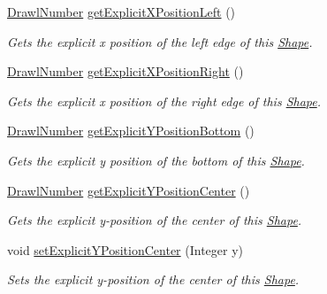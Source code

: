 \begin{DoxyCompactItemize}
\hyperlink{classcom_1_1aarrelaakso_1_1drawl_1_1_drawl_number}{Drawl\+Number} \hyperlink{classcom_1_1aarrelaakso_1_1drawl_1_1_shape_a339cf8811f57b7cb5251109b04be953c}{get\+Explicit\+X\+Position\+Left} ()
\begin{DoxyCompactList}\small\item\em Gets the explicit x position of the left edge of this \hyperlink{classcom_1_1aarrelaakso_1_1drawl_1_1_shape}{Shape}. \end{DoxyCompactList}\item 
\hyperlink{classcom_1_1aarrelaakso_1_1drawl_1_1_drawl_number}{Drawl\+Number} \hyperlink{classcom_1_1aarrelaakso_1_1drawl_1_1_shape_a19970b658b55e4e61de31aaaef8cf7fe}{get\+Explicit\+X\+Position\+Right} ()
\begin{DoxyCompactList}\small\item\em Gets the explicit x position of the right edge of this \hyperlink{classcom_1_1aarrelaakso_1_1drawl_1_1_shape}{Shape}. \end{DoxyCompactList}\item 
\hyperlink{classcom_1_1aarrelaakso_1_1drawl_1_1_drawl_number}{Drawl\+Number} \hyperlink{classcom_1_1aarrelaakso_1_1drawl_1_1_shape_aa26eb0263851ed8f8221bf3740e6e584}{get\+Explicit\+Y\+Position\+Bottom} ()
\begin{DoxyCompactList}\small\item\em Gets the explicit y position of the bottom of this \hyperlink{classcom_1_1aarrelaakso_1_1drawl_1_1_shape}{Shape}. \end{DoxyCompactList}\item 
\hyperlink{classcom_1_1aarrelaakso_1_1drawl_1_1_drawl_number}{Drawl\+Number} \hyperlink{classcom_1_1aarrelaakso_1_1drawl_1_1_shape_a602cb73f783f2856fa81e82bf7792263}{get\+Explicit\+Y\+Position\+Center} ()
\begin{DoxyCompactList}\small\item\em Gets the explicit y-\/position of the center of this \hyperlink{classcom_1_1aarrelaakso_1_1drawl_1_1_shape}{Shape}. \end{DoxyCompactList}\item 
void \hyperlink{classcom_1_1aarrelaakso_1_1drawl_1_1_shape_a947c00be2ea3d0e732814b8ca377df45}{set\+Explicit\+Y\+Position\+Center} (Integer y)
\begin{DoxyCompactList}\small\item\em Sets the explicit y-\/position of the center of this \hyperlink{classcom_1_1aarrelaakso_1_1drawl_1_1_shape}{Shape}. \end{DoxyCompactList}\item 

\end{DoxyCompactItemize}
